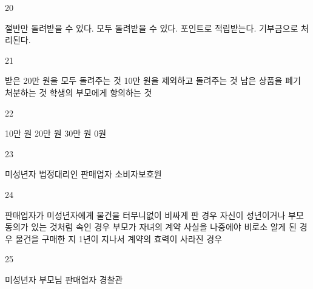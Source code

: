 \documentclass[fs9,seriesRus]{korfarm-base}
\begin{document}
\begin{kfSentenceUnit}{20}{}
\begin{kfChoices}
\kfChoice 절반만 돌려받을 수 있다.
\kfChoice 모두 돌려받을 수 있다.
\kfChoice 포인트로 적립받는다.
\kfChoice 기부금으로 처리된다.
\end{kfChoices}
\end{kfSentenceUnit}

\begin{kfSentenceUnit}{21}{}
\begin{kfChoices}
\kfChoice 받은 20만 원을 모두 돌려주는 것
\kfChoice 10만 원을 제외하고 돌려주는 것
\kfChoice 남은 상품을 폐기 처분하는 것
\kfChoice 학생의 부모에게 항의하는 것
\end{kfChoices}
\end{kfSentenceUnit}

\begin{kfSentenceUnit}{22}{}
\begin{kfChoices}
\kfChoice 10만 원
\kfChoice 20만 원
\kfChoice 30만 원
\kfChoice 0원
\end{kfChoices}
\end{kfSentenceUnit}

\begin{kfSentenceUnit}{23}{}
\begin{kfChoices}
\kfChoice 미성년자
\kfChoice 법정대리인
\kfChoice 판매업자
\kfChoice 소비자보호원
\end{kfChoices}
\end{kfSentenceUnit}

\begin{kfSentenceUnit}{24}{}
\begin{kfChoices}
\kfChoice 판매업자가 미성년자에게 물건을 터무니없이 비싸게 판 경우
\kfChoice 자신이 성년이거나 부모 동의가 있는 것처럼 속인 경우
\kfChoice 부모가 자녀의 계약 사실을 나중에야 비로소 알게 된 경우
\kfChoice 물건을 구매한 지 1년이 지나서 계약의 효력이 사라진 경우
\end{kfChoices}
\end{kfSentenceUnit}

\begin{kfSentenceUnit}{25}{}
\begin{kfChoices}
\kfChoice 미성년자
\kfChoice 부모님
\kfChoice 판매업자
\kfChoice 경찰관
\end{kfChoices}
\end{kfSentenceUnit}
\end{document}
